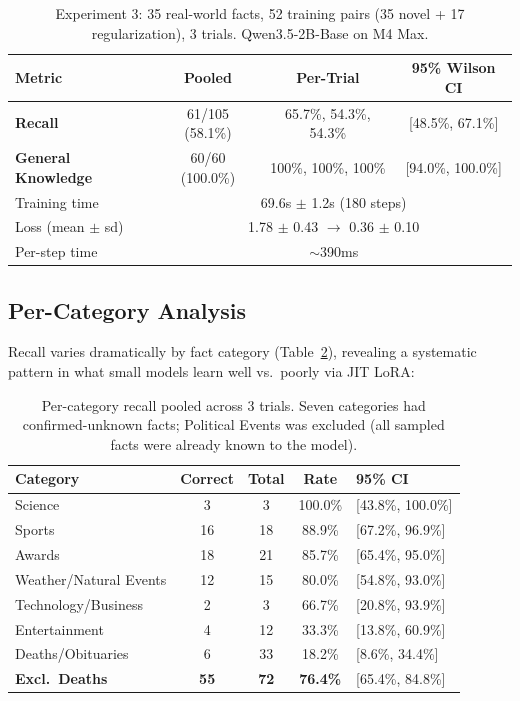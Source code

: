\documentclass[11pt,a4paper]{article}
\begin{document}
\begin{table}[H]
\centering
\caption{Experiment 3: 35 real-world facts, 52 training pairs (35 novel + 17 regularization), 3 trials. Qwen3.5-2B-Base on M4 Max.}
\label{tab:exp3}
\begin{tabular}{lccc}
\toprule
\textbf{Metric} & \textbf{Pooled} & \textbf{Per-Trial} & \textbf{95\% Wilson CI} \\
\midrule
\textbf{Recall} & 61/105 (58.1\%) & 65.7\%, 54.3\%, 54.3\% & [48.5\%, 67.1\%] \\
\textbf{General Knowledge} & 60/60 (100.0\%) & 100\%, 100\%, 100\% & [94.0\%, 100.0\%] \\
\midrule
Training time & \multicolumn{3}{c}{69.6s $\pm$ 1.2s (180 steps)} \\
Loss (mean $\pm$ sd) & \multicolumn{3}{c}{1.78 $\pm$ 0.43 $\rightarrow$ 0.36 $\pm$ 0.10} \\
Per-step time & \multicolumn{3}{c}{$\sim$390ms} \\
\bottomrule
\end{tabular}
\end{table}

\subsection{Per-Category Analysis}

Recall varies dramatically by fact category (Table~\ref{tab:categories}), revealing a systematic pattern in what small models learn well vs.\ poorly via JIT LoRA:

\begin{table}[H]
\centering
\caption{Per-category recall pooled across 3 trials. Seven categories had confirmed-unknown facts; Political Events was excluded (all sampled facts were already known to the model).}
\label{tab:categories}
\begin{tabular}{lcccl}
\toprule
\textbf{Category} & \textbf{Correct} & \textbf{Total} & \textbf{Rate} & \textbf{95\% CI} \\
\midrule
Science & 3 & 3 & 100.0\% & [43.8\%, 100.0\%] \\
Sports & 16 & 18 & 88.9\% & [67.2\%, 96.9\%] \\
Awards & 18 & 21 & 85.7\% & [65.4\%, 95.0\%] \\
Weather/Natural Events & 12 & 15 & 80.0\% & [54.8\%, 93.0\%] \\
Technology/Business & 2 & 3 & 66.7\% & [20.8\%, 93.9\%] \\
Entertainment & 4 & 12 & 33.3\% & [13.8\%, 60.9\%] \\
Deaths/Obituaries & 6 & 33 & 18.2\% & [8.6\%, 34.4\%] \\
\midrule
\textbf{Excl.\ Deaths} & \textbf{55} & \textbf{72} & \textbf{76.4\%} & [65.4\%, 84.8\%] \\
\bottomrule
\end{tabular}
\end{table}
\end{document}
